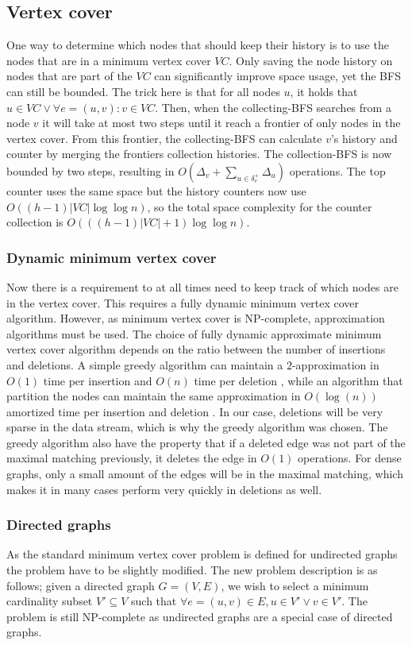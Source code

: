 \subsection{Vertex cover}
One way to determine which nodes that should keep their history is to use the nodes that are in a minimum vertex cover $VC$. Only saving the node history on nodes that are part of the $VC$ can significantly improve space usage, yet the BFS can still be bounded. The trick here is that for all nodes $u$, it holds that $u \in VC \vee \forall e = (u,v) : v \in VC$. Then, when the collecting-BFS searches from a node $v$ it will take at most two steps until it reach a frontier of only nodes in the vertex cover. From this frontier, the collecting-BFS can calculate $v$'s history and counter by merging the frontiers collection histories. The collection-BFS is now bounded by two steps, resulting in $O(\Delta_v + \sum_{u \in \delta^+_v}{\Delta_u}) $ operations. The top counter uses the same space but the history counters now use $O((h-1)|VC| \log \log n)$, so the total space complexity for the counter collection is $O(((h-1)|VC| + 1 )\log \log n)$.


\subsubsection{Dynamic minimum vertex cover}
Now  there is a requirement to at all times need to keep track of which nodes are in the vertex cover. This requires a fully dynamic minimum vertex cover algorithm. However, as minimum vertex cover is NP-complete, approximation algorithms must be used. The choice of fully dynamic approximate minimum vertex cover algorithm depends on the ratio between the number of insertions and deletions. A simple greedy algorithm can maintain a $2$-approximation in $O(1)$ time per insertion and $O(n)$ time per deletion \cite{2appdynvc}, while an algorithm that partition the nodes can maintain the same approximation in $O(\log(n))$ amortized time per insertion and deletion \cite{2appdynvclogn}. In our case, deletions will be very sparse in the data stream, which is why the greedy algorithm was chosen. The greedy algorithm also have the property that if a deleted edge was not part of the maximal matching previously, it deletes the edge in $O(1)$ operations. For dense graphs, only a small amount of the edges will be in the maximal matching, which makes it in many cases perform very quickly in deletions as well. 

 
\subsubsection{Directed graphs}
As the standard minimum vertex cover problem is defined for undirected graphs the problem have to be slightly modified. The new problem description is as follows; given a directed graph $G = (V,E)$, we wish to select a minimum cardinality subset $V' \subseteq V$ such that $\forall e = (u,v) \in E, u \in V' \vee v \in V'$. The problem is still NP-complete as undirected graphs are a special case of directed graphs. 

